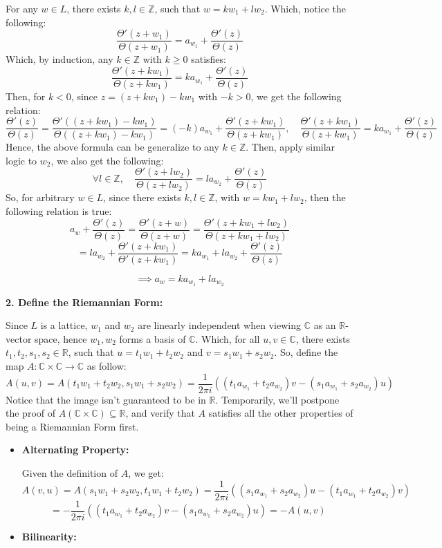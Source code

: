 \documentclass{article}
\begin{document}
\begin{itemize}
    For any $w\in L$, there exists $k,l\in\mathbb{Z}$, such that $w=kw_1+lw_2$. Which, notice the following:
    $$\frac{\Theta'(z+w_1)}{\Theta(z+w_1)}=a_{w_1}+\frac{\Theta'(z)}{\Theta(z)}$$
    Which, by induction, any $k\in\mathbb{Z}$ with $k\geq 0$ satisfies:
    $$\frac{\Theta'(z+kw_1)}{\Theta(z+kw_1)}=ka_{w_1}+\frac{\Theta'(z)}{\Theta(z)}$$
    Then, for $k<0$, since $z=(z+kw_1)-kw_1$ with $-k>0$, we get the following relation:
    $$\frac{\Theta'(z)}{\Theta(z)}=\frac{\Theta'((z+kw_1)-kw_1)}{\Theta((z+kw_1)-kw_1)} = (-k)a_{w_1}+\frac{\Theta'(z+kw_1)}{\Theta(z+kw_1)},\quad \frac{\Theta'(z+kw_1)}{\Theta(z+kw_1)} = ka_{w_1}+\frac{\Theta'(z)}{\Theta(z)}$$
    Hence, the above formula can be generalize to any $k\in\mathbb{Z}$. Then, apply similar logic to $w_2$, we also get the following:
    $$\forall l\in\mathbb{Z},\quad \frac{\Theta'(z+lw_2)}{\Theta(z+lw_2)} = la_{w_2}+\frac{\Theta'(z)}{\Theta(z)}$$
    So, for arbitrary $w\in L$, since there exists $k,l\in\mathbb{Z}$, with $w=kw_1+lw_2$, then the following relation is true:
    $$a_w+\frac{\Theta'(z)}{\Theta(z)}=\frac{\Theta'(z+w)}{\Theta(z+w)} = \frac{\Theta'(z+kw_1+lw_2)}{\Theta(z+kw_1+lw_2)}$$
    $$ = la_{w_2}+\frac{\Theta'(z+kw_1)}{\Theta'(z+kw_1)} = ka_{w_1}+la_{w_2}+\frac{\Theta'(z)}{\Theta(z)}$$
    
    $$\implies a_w = ka_{w_1}+la_{w_2}$$

    \hfil

    \textbf{2. Define the Riemannian Form:}

    Since $L$ is a lattice, $w_1$ and $w_2$ are linearly independent when viewing $\mathbb{C}$ as an $\mathbb{R}$-vector space, hence $w_1,w_2$ forms a basis of $\mathbb{C}$. Which, for all $u,v\in\mathbb{C}$, there exists $t_1,t_2,s_1,s_2\in\mathbb{R}$, such that $u=t_1w_1+t_2w_2$ and $v=s_1w_1+s_2w_2$. So, define the map $A:\mathbb{C}\times\mathbb{C}\rightarrow\mathbb{C}$ as follow:
    $$A(u,v) = A(t_1w_1+t_2w_2,s_1w_1+s_2w_2) = \frac{1}{2\pi i}((t_1a_{w_1}+t_2a_{w_2})v - (s_1a_{w_1}+s_2a_{w_2})u)$$
    Notice that the image isn't guaranteed to be in $\mathbb{R}$. Temporarily, we'll postpone the proof of $A(\mathbb{C}\times \mathbb{C})\subseteq \mathbb{R}$, and verify that $A$ satisfies all the other properties of being a Riemannian Form first.
    \begin{itemize}
        \item \textbf{Alternating Property:}
        
        Given the definition of $A$, we get:
        $$A(v,u)=A(s_1w_1+s_2w_2,t_1w_1+t_2w_2) = \frac{1}{2\pi i}((s_1a_{w_1}+s_2a_{w_2})u-(t_1a_{w_1}+t_2a_{w_2})v)$$
        $$ = -\frac{1}{2\pi i}((t_1a_{w_1}+t_2a_{w_2})v-(s_1a_{w_1}+s_2a_{w_2})u) = -A(u,v)$$
        \item \textbf{Bilinearity:}
        

\end{itemize}
\end{itemize}
\end{document}

